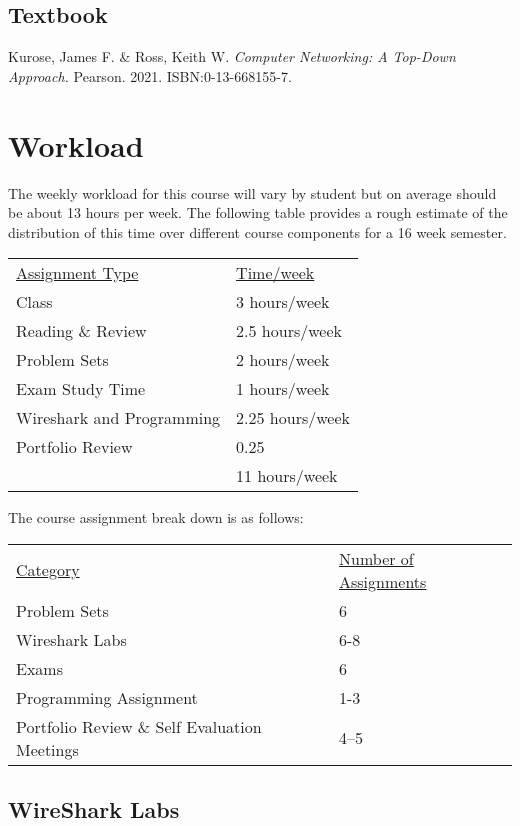 \documentclass[10pt]{article}
\begin{document}
\subsection{Textbook}

\noindent
Kurose, James F. \& Ross, Keith W. \textit{Computer Networking: A Top-Down Approach.} Pearson. 2021. ISBN:0-13-668155-7. %


\section{Workload}

The weekly workload for this course will vary by student but on average should be about 13 hours per week.  The following table provides a rough estimate of the distribution of this time over different course components for a 16 week semester.

\begin{center}
\begin{tabular}{ll}
\underline{Assignment Type}  & \underline{Time/week} \\
Class   & 3 hours/week \\
Reading \& Review  & 2.5 hours/week \\
Problem Sets & 2 hours/week \\
Exam Study Time & 1 hours/week \\
Wireshark and Programming  & 2.25 hours/week \\
Portfolio Review & 0.25 \\
\bottomrule
 & 11 hours/week
\end{tabular}
\end{center}


The course assignment break down is as follows:

\begin{center}
  \begin{tabular}{ll}
    \underline{Category} & \underline{Number of Assignments} \\
    Problem Sets & 6 \\
    Wireshark Labs & 6-8 \\    
    Exams & 6 \\
    Programming Assignment & 1-3 \\
    Portfolio Review \& Self Evaluation Meetings & 4--5 \\
  \end{tabular}
\end{center}


\subsection*{WireShark Labs}
\end{document}
